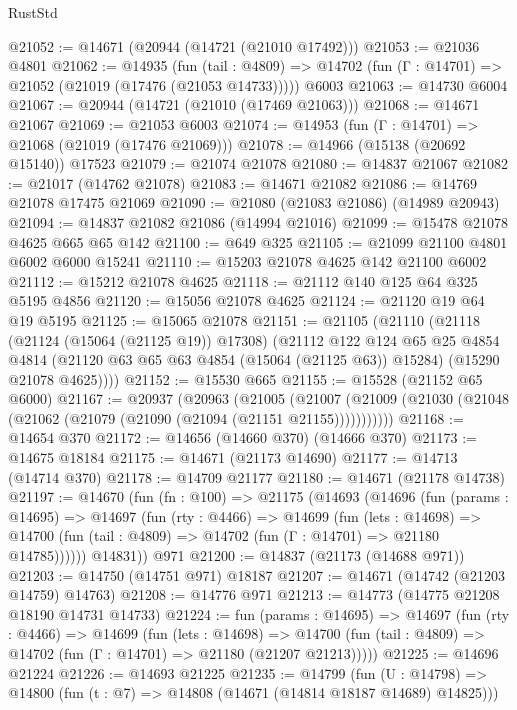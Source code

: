 \begin{lexlean}{RustStd}
\begin{coremodule}
@21052 := @14671 (@20944 (@14721 (@21010 @17492)))
@21053 := @21036 @4801
@21062 := @14935
    (fun (tail : @4809) => @14702 (fun (Γ : @14701) => @21052 (@21019 (@17476 (@21053 @14733)))))
    @6003
@21063 := @14730 @6004
@21067 := @20944 (@14721 (@21010 (@17469 @21063)))
@21068 := @14671 @21067
@21069 := @21053 @6003
@21074 := @14953 (fun (Γ : @14701) => @21068 (@21019 (@17476 @21069)))
@21078 := @14966 (@15138 (@20692 @15140)) @17523
@21079 := @21074 @21078
@21080 := @14837 @21067
@21082 := @21017 (@14762 @21078)
@21083 := @14671 @21082
@21086 := @14769 @21078 @17475 @21069
@21090 := @21080 (@21083 @21086) (@14989 @20943)
@21094 := @14837 @21082 @21086 (@14994 @21016)
@21099 := @15478 @21078 @4625 @665 @65 @142
@21100 := @649 @325
@21105 := @21099 @21100 @4801 @6002 @6000 @15241
@21110 := @15203 @21078 @4625 @142 @21100 @6002
@21112 := @15212 @21078 @4625
@21118 := @21112 @140 @125 @64 @325 @5195 @4856
@21120 := @15056 @21078 @4625
@21124 := @21120 @19 @64 @19 @5195
@21125 := @15065 @21078
@21151 := @21105
    (@21110
      (@21118
        (@21124 (@15064 (@21125 @19)) @17308)
        (@21112
          @122
          @124
          @65
          @25
          @4854
          @4814
          (@21120 @63 @65 @63 @4854 (@15064 (@21125 @63)) @15284)
          (@15290 @21078 @4625))))
@21152 := @15530 @665
@21155 := @15528 (@21152 @65 @6000)
@21167 := @20937
    (@20963
      (@21005
        (@21007 (@21009 (@21030 (@21048 (@21062 (@21079 (@21090 (@21094 (@21151 @21155)))))))))))
@21168 := @14654 @370
@21172 := @14656 (@14660 @370) (@14666 @370)
@21173 := @14675 @18184
@21175 := @14671 (@21173 @14690)
@21177 := @14713 (@14714 @370)
@21178 := @14709 @21177
@21180 := @14671 (@21178 @14738)
@21197 := @14670
    (fun (fn : @100) =>
    @21175
      (@14693
        (@14696
          (fun (params : @14695) =>
          @14697
            (fun (rty : @4466) =>
            @14699
              (fun (lets : @14698) =>
              @14700 (fun (tail : @4809) => @14702 (fun (Γ : @14701) => @21180 @14785))))))
        @14831))
    @971
@21200 := @14837 (@21173 (@14688 @971))
@21203 := @14750 (@14751 @971) @18187
@21207 := @14671 (@14742 (@21203 @14759) @14763)
@21208 := @14776 @971
@21213 := @14773 (@14775 @21208 @18190 @14731 @14733)
@21224 := fun (params : @14695) =>
  @14697
    (fun (rty : @4466) =>
    @14699
      (fun (lets : @14698) =>
      @14700 (fun (tail : @4809) => @14702 (fun (Γ : @14701) => @21180 (@21207 @21213)))))
@21225 := @14696 @21224
@21226 := @14693 @21225
@21235 := @14799
    (fun (U : @14798) => @14800 (fun (t : @7) => @14808 (@14671 (@14814 @18187 @14689) @14825)))

\end{coremodule}
\end{lexlean}
